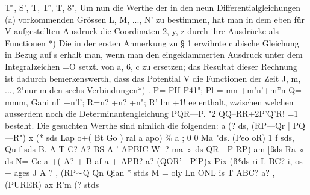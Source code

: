 \documentclass[11pt]{article}
\begin{document}
T", S’, T, T’, T, 8", Um nun die Werthe der in den neun Differentialgleichungen (a) vorkommenden Grössen L, M, ..., N’ zu bestimmen, hat man in dem eben für V aufgestellten
Ausdruck die Coordinaten 2, y, z durch ihre Ausdrücke als Functionen *) Die in der ersten
Anmerkung zu § 1 erwihnte cubische Gleichung in Bezug auf s erhalt man, wenn man den
eingeklammerten Ausdruck unter dem Integralzeichen =O setzt.
von a, 6, c zu ersetzen; das Resultat dieser Rechnung ist dadurch bemerkenswerth,
dass das Potential V die Functionen der Zeit J, m, ..., 2"nur m den sechs Verbindungen*)
. P= PH P41"; Pl = mn-+m’n’+m”n Q= mmm, Gani nll +n’l’; R=n? +n? +n"; R’ lm
+1! ee enthalt, zwischen welchen ausserdem noch die Determinantengleichung PQR—P.
"2 QQ–RR+2P’Q’R! =1 besteht. Die gesuchten Werthe sind nimlich die folgenden: a (?
ds, (RP—Qr | PQ—R") x (* sds Lap o+( Bt Go ) ral a apo) \% a ; 0 0 Ma "ds. (Peo oR)
1 f sds, Qu f sds B. A T C? A? BS A ’ APBIC Wi ? ma ◦ ds QR—P RP) am [ßds Ra ◦ ds
N= Cc a +( A? + B af a + APB? a? (QOR’—P’P)x Pix (ß*ds ri L BC? i, os + ages J A
? , (RP∼Q Qn Qian * stds M = oly Ln ONL is T ABC? a? , (PURER) ax R’m (? stds
\end{document}
